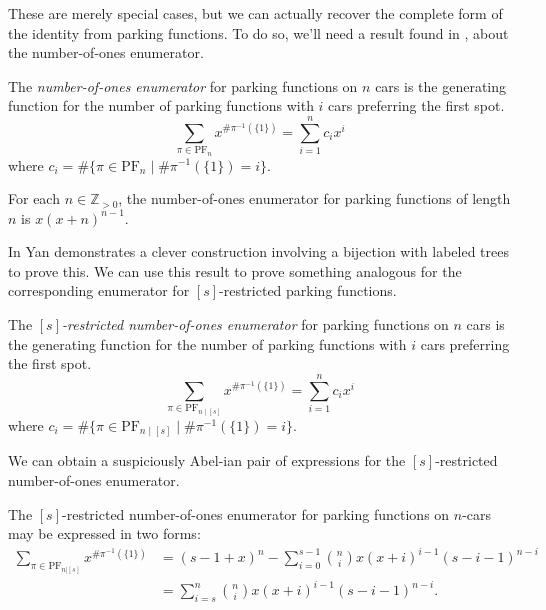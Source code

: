 \documentclass[12pt]{article}
\begin{document}
These are merely special cases, but we can actually recover the complete form of the identity from parking functions. To do so, we'll need a result found in \cite{yan-survey-2015}, about the number-of-ones enumerator.

\begin{definition}
	The \emph{number-of-ones enumerator} for parking functions on $n$ cars is the generating function for the number of parking functions with $i$ cars preferring the first spot.
	\[
		\sum_{\pi \in \mathrm{PF}_{n}} x^{\# \pi^{-1}(\{ 1 \})} = \sum_{i = 1}^{n} c_{i} x^{i}
	\]
	where $c_{i} = \# \{ \pi \in \mathrm{PF}_{n} \mid \# \pi^{-1}(\{ 1 \}) = i \}$.
\end{definition}

\begin{lemma}
    For each $n\in\mathbb{Z}_{>0}$, the number-of-ones enumerator for parking functions of length $n$ is $x(x + n)^{n - 1}$.
\end{lemma}

In \cite{yan-survey-2015} Yan demonstrates a clever construction involving a bijection with labeled trees to prove this. We can use this result to prove something analogous for the corresponding enumerator for $[s]$-restricted parking functions. 

\begin{definition}
	The \emph{$[s]$-restricted number-of-ones enumerator} for parking functions on $n$ cars is the generating function for the number of parking functions with $i$ cars preferring the first spot.
	\[
		\sum_{\pi \in \mathrm{PF}_{n \mid [s]}} x^{\# \pi^{-1}(\{ 1 \})} = \sum_{i = 1}^{n} c_{i} x^{i}
	\]
	where $c_{i} = \# \{ \pi \in \mathrm{PF}_{n \mid [s]} \mid \# \pi^{-1}(\{ 1 \}) = i \}$.
\end{definition}

We can obtain a suspiciously Abel-ian pair of expressions for the $[s]$-restricted number-of-ones enumerator.

\begin{theorem}
    \label{thm:res-1s-enumerator}
    The $[s]$-restricted number-of-ones enumerator for parking functions on $n$-cars may be expressed in two forms:
    \begin{align*}
    \sum_{\pi\in\mathrm{PF}_{n|[s]}}x^{\# \pi^{-1}(\{1\})}&=(s-1+x)^{n} - \sum_{i = 0}^{s - 1} \binom{n}{i} x(x + i)^{i - 1} (s - i - 1)^{n - i}\\
    &=\sum_{i = s}^{n} \binom{n}{i} x(x + i)^{i - 1} (s - i - 1)^{n - i}.
    \end{align*}
\end{theorem}
\end{document}
